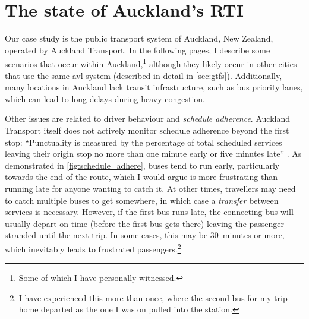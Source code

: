 \section{The state of Auckland's RTI}
\label{sec:auckland_etas}

Our case study is the public transport system of Auckland, New Zealand, operated by Auckland Transport. In the following pages, I describe some scenarios that occur within Auckland,\footnote{Some of which I have personally witnessed.} although they likely occur in other cities that use the same \gls{avl} system (described in detail in \cref{sec:gtfs}). Additionally, many locations in Auckland lack transit infrastructure, such as bus priority lanes, which can lead to long delays during heavy congestion.


Other issues are related to driver behaviour and \emph{schedule adherence}. Auckland Transport itself does not actively monitor schedule adherence beyond the first stop: ``Punctuality is measured by the percentage of total scheduled services leaving their origin stop no more than one minute early or five minutes late'' \citep[13]{AT_report_2019}. As demonstrated in \cref{fig:schedule_adhere}, buses tend to run early, particularly towards the end of the route, which I would argue is more frustrating than running late for anyone wanting to catch it. At other times, travellers may need to catch multiple buses to get somewhere, in which case a \emph{transfer} between services is necessary. However, if the first bus runs late, the connecting bus will usually depart on time (before the first bus gets there) leaving the passenger stranded until the next trip. In some cases, this may be 30~minutes or more, which inevitably leads to frustrated passengers.\footnote{I have experienced this more than once, where the second bus for my trip home departed as the one I was on pulled into the station.}



